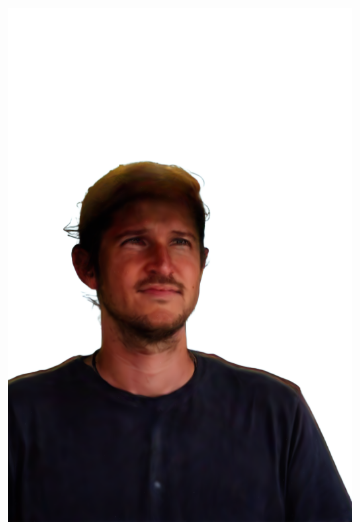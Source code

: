\begin{figure}[ht]
\begin{subfigure}{0.08\linewidth}
        \includegraphics[width=\textwidth]{Figures/results/low/ephra_cowboy/11_render.png}

\end{subfigure}
\end{figure}
